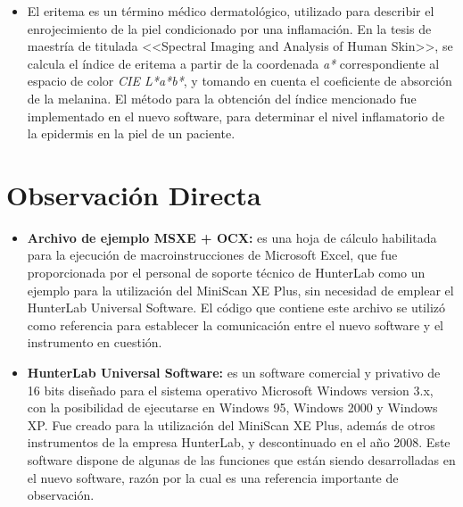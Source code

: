 \begin{itemize}
			\item El eritema es un t\'{e}rmino m\'{e}dico dermatol\'{o}gico, utilizado para describir el enrojecimiento de la piel condicionado por una inflamaci\'{o}n. En la tesis de maestr\'{i}a de \cite{Bersha} titulada <<Spectral Imaging and Analysis of Human Skin>>, se calcula el \'{i}ndice de eritema a partir de la coordenada \textit{a*} correspondiente al espacio de color \textit{CIE L*a*b*}, y tomando en cuenta el coeficiente de absorci\'{o}n de la melanina. El m\'{e}todo para la obtenci\'{o}n del \'{i}ndice mencionado fue implementado en el nuevo software, para determinar el nivel inflamatorio de la epidermis en la piel de un paciente.
		\end{itemize}

	\section{Observaci\'{o}n Directa}
		\begin{itemize}
		
			\item \textbf{Archivo de ejemplo MSXE + OCX:} es una hoja de c\'{a}lculo habilitada para la ejecuci\'{o}n de macroinstrucciones de Microsoft Excel, que fue proporcionada por el personal de soporte t\'{e}cnico de HunterLab como un ejemplo para la utilizaci\'{o}n del MiniScan XE Plus, sin necesidad de emplear el HunterLab Universal Software. El c\'{o}digo que contiene este archivo se utiliz\'{o} como referencia para establecer la comunicaci\'{o}n entre el nuevo software y el instrumento en cuesti\'{o}n.

			\newpage
			
			\item \textbf{HunterLab Universal Software:} es un software comercial y privativo de 16 bits dise\~{n}ado para el sistema operativo Microsoft Windows version 3.x, con la posibilidad de ejecutarse en Windows 95, Windows 2000 y Windows XP. Fue creado para la utilizaci\'{o}n del MiniScan XE Plus, adem\'{a}s de otros instrumentos de la empresa HunterLab, y descontinuado en el a\~{n}o 2008. Este software dispone de algunas de las funciones que est\'{a}n siendo desarrolladas en el nuevo software, raz\'{o}n por la cual es una referencia importante de observaci\'{o}n.

		\end{itemize}